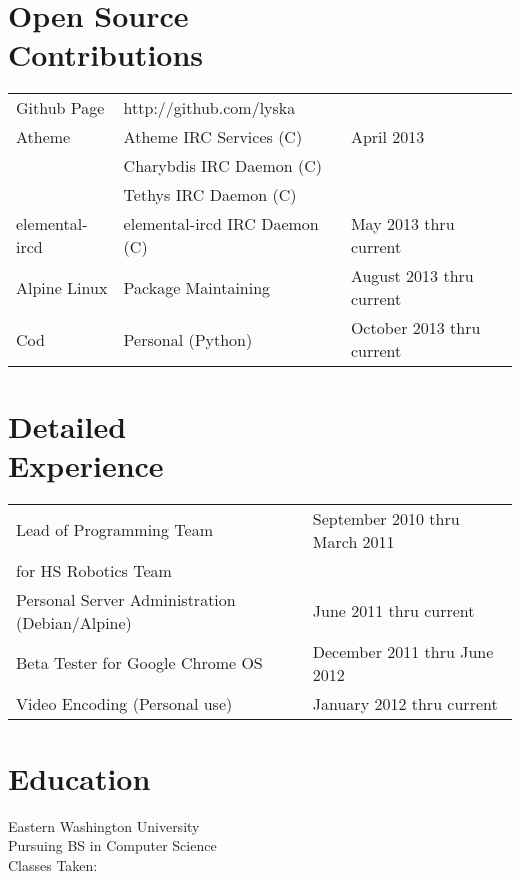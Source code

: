 \documentclass[line, margin]{res}
\begin{document}
\address{+1 (425) 221-7761}

\begin{resume}

	\section{Open Source \\ Contributions}
	\begin{tabular}{l l l}
		Github Page & \hfill http://github.com/lyska & \\ [5pt]
		Atheme & \hfill Atheme IRC Services (C) & \hfill April 2013 \\ 
	 & \hfill Charybdis IRC Daemon (C) \\
	 & \hfill Tethys IRC Daemon (C) \\
		elemental-ircd & \hfill elemental-ircd IRC Daemon (C) & \hfill May 2013 thru current \\
		Alpine Linux & \hfill Package Maintaining & \hfill August 2013 thru current \\
		Cod & \hfill Personal (Python) & \hfill October 2013 thru current
	\end{tabular}

	\section{Detailed \\ Experience}
	\begin{tabular}{l l}
		Lead of Programming Team & \hfill September 2010 thru March 2011 \\ 
		for HS Robotics Team & \\
		Personal Server Administration (Debian/Alpine) & \hfill June 2011 thru current  \\
		Beta Tester for Google Chrome OS & \hfill December 2011 thru June 2012 \\
		Video Encoding (Personal use) & January 2012 thru current \\
	\end{tabular}


	\section{Education}

	Eastern Washington University \\ Pursuing BS in Computer Science \\
	Classes Taken:


\end{resume}
\end{document}
